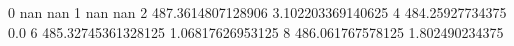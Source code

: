 0 nan nan
1 nan nan
2 487.3614807128906 3.102203369140625
4 484.25927734375 0.0
6 485.32745361328125 1.06817626953125
8 486.061767578125 1.802490234375
